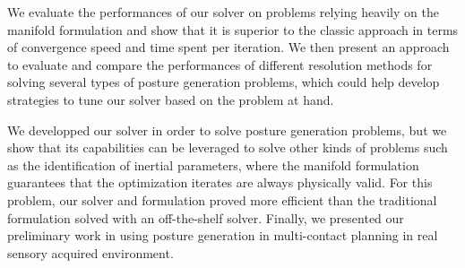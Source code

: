 We evaluate the performances of our solver on problems relying heavily on the manifold formulation and show that it is superior to the classic approach in terms of convergence speed and time spent per iteration.
We then present an approach to evaluate and compare the performances of different resolution methods for solving several types of posture generation problems, which could help develop strategies to tune our solver based on the problem at hand.

We developped our solver in order to solve posture generation problems, but we show that its capabilities can be leveraged to solve other kinds of problems such as the identification of inertial parameters, where the manifold formulation guarantees that the optimization iterates are always physically valid.
For this problem, our solver and formulation proved more efficient than the traditional formulation solved with an off-the-shelf solver.
Finally, we presented our preliminary work in using posture generation in multi-contact planning in real sensory acquired environment.


